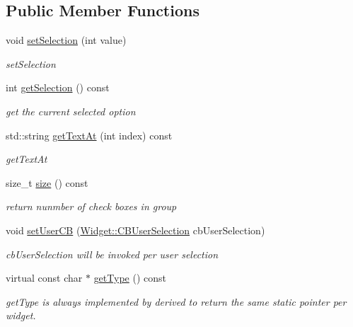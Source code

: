 \subsection*{Public Member Functions}
\begin{DoxyCompactItemize}
\item 
void \hyperlink{classcanvascv_1_1RadioButtons_ae5da98c26e7e21d48201b2df06aeb9a3}{set\+Selection} (int value)
\begin{DoxyCompactList}\small\item\em set\+Selection \end{DoxyCompactList}\item 
int \hyperlink{classcanvascv_1_1RadioButtons_ae561b067a70c9e37ebf45befd62f842b}{get\+Selection} () const \hypertarget{classcanvascv_1_1RadioButtons_ae561b067a70c9e37ebf45befd62f842b}{}\label{classcanvascv_1_1RadioButtons_ae561b067a70c9e37ebf45befd62f842b}

\begin{DoxyCompactList}\small\item\em get the current selected option \end{DoxyCompactList}\item 
std\+::string \hyperlink{classcanvascv_1_1RadioButtons_a6a1570cb5b8328fba59bb0c17f63debc}{get\+Text\+At} (int index) const 
\begin{DoxyCompactList}\small\item\em get\+Text\+At \end{DoxyCompactList}\item 
size\+\_\+t \hyperlink{classcanvascv_1_1RadioButtons_a1763254613887741727490ec65c21399}{size} () const \hypertarget{classcanvascv_1_1RadioButtons_a1763254613887741727490ec65c21399}{}\label{classcanvascv_1_1RadioButtons_a1763254613887741727490ec65c21399}

\begin{DoxyCompactList}\small\item\em return nunmber of check boxes in group \end{DoxyCompactList}\item 
void \hyperlink{classcanvascv_1_1RadioButtons_abc50e587c83543df58d8cedcab44daaf}{set\+User\+CB} (\hyperlink{classcanvascv_1_1Widget_a977cbd39cf203c5866f07f3645c7e4bc}{Widget\+::\+C\+B\+User\+Selection} cb\+User\+Selection)\hypertarget{classcanvascv_1_1RadioButtons_abc50e587c83543df58d8cedcab44daaf}{}\label{classcanvascv_1_1RadioButtons_abc50e587c83543df58d8cedcab44daaf}

\begin{DoxyCompactList}\small\item\em cb\+User\+Selection will be invoked per user selection \end{DoxyCompactList}\item 
virtual const char $\ast$ \hyperlink{classcanvascv_1_1RadioButtons_ab62b0f2908eebb4881844bfc25f6319f}{get\+Type} () const 
\begin{DoxyCompactList}\small\item\em get\+Type is always implemented by derived to return the same static pointer per widget. \end{DoxyCompactList}\end{DoxyCompactItemize}
